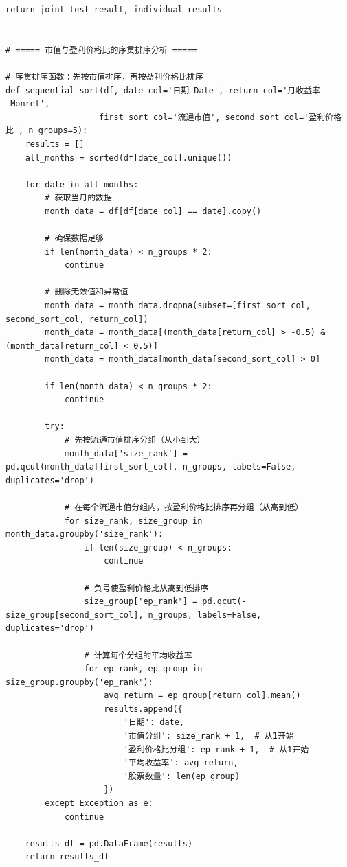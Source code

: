 \documentclass[12pt, a4paper]{article}
\begin{document}
\begin{lstlisting}[basicstyle=\small\ttfamily, breaklines=true, columns=fullflexible]
    return joint_test_result, individual_results


# ===== 市值与盈利价格比的序贯排序分析 =====

# 序贯排序函数：先按市值排序，再按盈利价格比排序
def sequential_sort(df, date_col='日期_Date', return_col='月收益率_Monret', 
                   first_sort_col='流通市值', second_sort_col='盈利价格比', n_groups=5):
    results = []
    all_months = sorted(df[date_col].unique())
    
    for date in all_months:
        # 获取当月的数据
        month_data = df[df[date_col] == date].copy()
        
        # 确保数据足够
        if len(month_data) < n_groups * 2:
            continue
            
        # 删除无效值和异常值
        month_data = month_data.dropna(subset=[first_sort_col, second_sort_col, return_col])
        month_data = month_data[(month_data[return_col] > -0.5) & (month_data[return_col] < 0.5)]
        month_data = month_data[month_data[second_sort_col] > 0]
        
        if len(month_data) < n_groups * 2:
            continue
        
        try:
            # 先按流通市值排序分组（从小到大）
            month_data['size_rank'] = pd.qcut(month_data[first_sort_col], n_groups, labels=False, duplicates='drop')
            
            # 在每个流通市值分组内，按盈利价格比排序再分组（从高到低）
            for size_rank, size_group in month_data.groupby('size_rank'):
                if len(size_group) < n_groups:
                    continue
                
                # 负号使盈利价格比从高到低排序
                size_group['ep_rank'] = pd.qcut(-size_group[second_sort_col], n_groups, labels=False, duplicates='drop')
                
                # 计算每个分组的平均收益率
                for ep_rank, ep_group in size_group.groupby('ep_rank'):
                    avg_return = ep_group[return_col].mean()
                    results.append({
                        '日期': date,
                        '市值分组': size_rank + 1,  # 从1开始
                        '盈利价格比分组': ep_rank + 1,  # 从1开始
                        '平均收益率': avg_return,
                        '股票数量': len(ep_group)
                    })
        except Exception as e:
            continue
    
    results_df = pd.DataFrame(results)
    return results_df


\end{lstlisting}
\end{document}

